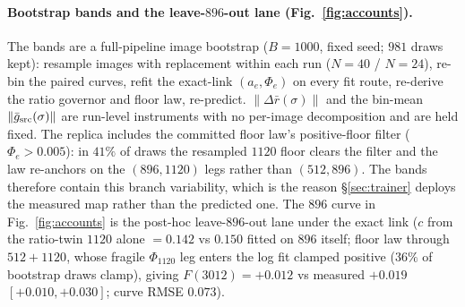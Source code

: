 \paragraph{Bootstrap bands and the leave-$896$-out lane
(Fig.~\ref{fig:accounts}).} The bands are a full-pipeline image bootstrap
($B{=}1000$, fixed seed; $981$ draws kept): resample images with
replacement within each run ($N{=}40$ / $N{=}24$), re-bin the paired
curves, refit the exact-link $(a_e, \Phi_e)$ on every fit route,
re-derive the ratio governor and floor law, re-predict.
$\|\Delta \bar r(\sigma)\|$ and
the bin-mean $\|\bar g_{\mathrm{src}}(\sigma)\|$ are run-level instruments with
no per-image decomposition and are held fixed. The replica includes the
committed floor law's positive-floor filter ($\Phi_e > 0.005$): in
$41\%$ of draws the resampled $1120$ floor clears the filter and the law
re-anchors on the $(896, 1120)$ legs rather than $(512, 896)$. The
bands therefore contain this branch variability, which is the reason
\S\ref{sec:trainer} deploys the measured map rather than the predicted
one. The $896$ curve in Fig.~\ref{fig:accounts} is the post-hoc
leave-$896$-out lane under the exact link ($c$ from the ratio-twin
$1120$ alone $= 0.142$ vs $0.150$ fitted on $896$ itself; floor law
through $512{+}1120$, whose fragile $\Phi_{1120}$ leg enters the log
fit clamped positive ($36\%$ of bootstrap draws clamp), giving
$F(3012) = +0.012$ vs measured $+0.019$ $[+0.010, +0.030]$; curve RMSE
$0.073$).

